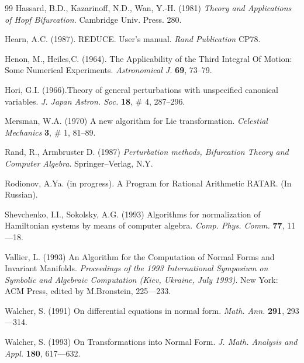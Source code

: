 \begin{thebibliography}{99}
Hassard, B.D., Kazarinoff, N.D., Wan, Y.-H. (1981)
{\em Theory and Applications of Hopf Bifurcation.\/} Cambridge Univ. 
Press. 280.

Hearn, A.C. (1987). REDUCE. User's manual. {\em  Rand Publication\/} 
CP78.

Henon, M., Heiles,C. (1964). The Applicability 
of  the Third Integral Of Motion: Some  Numerical  Experiments. 
{\em Astronomical J.\/} {\bf 69}, 73--79.

Hori, G.I. (1966).Theory of general perturbations with unspecified
canonical variables. {\em J. Japan Astron. Soc.\/} {\bf 18}, \# 4, 
287--296.

Mersman, W.A. (1970)  A new algorithm for Lie transformation. 
{\em Celestial Mechanics} {\bf 3}, \# 1, 81--89.

Rand, R., Armbruster D. (1987) {\em Perturbation methods, Bifurcation 
Theory and Computer Algebra\/}. Springer--Verlag, N.Y.

Rodionov, A.Ya. (in progress). A Program for Rational Arithmetic 
RATAR. (In Russian).

Shevchenko, I.I., Sokolsky, A.G. (1993) Algorithms for normalization of
Hamiltonian systems by means of computer algebra. {\em Comp. Phys. Comm.}
{\bf 77}, 11---18.

Vallier, L. (1993) An Algorithm for the Computation of Normal Forms and 
Invariant Manifolds.
{\em  Proceedings  of the 1993 International Symposium on Symbolic  
and Algebraic Computation (Kiev,  Ukraine, July 1993)\/}. New York: ACM 
Press, edited by M.Bronstein, 225---233.

Walcher, S. (1991) On differential equations in normal form. 
{\em Math. Ann.\/} {\bf 291}, 293---314.

Walcher, S. (1993) On Transformations into Normal Form. {\em J. Math. 
Analysis and Appl.\/} {\bf 180}, 617---632.

\end{thebibliography}


